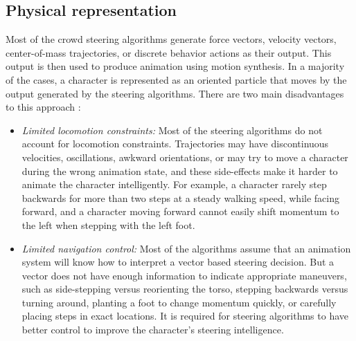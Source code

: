 \documentclass[tog]{acmsiggraph}
\begin{document}
\subsection{Physical representation}
Most of the crowd steering algorithms generate force vectors, velocity vectors, center-of-mass trajectories, or discrete behavior actions as their output. This output is then used to produce animation using motion synthesis. In a majority of the cases, a character is represented as an oriented particle that moves by the output generated by the steering algorithms. There are two main disadvantages to this approach \cite{singh2010interface}:
\begin{itemize}
\item \textit{Limited locomotion constraints:} Most of the steering algorithms do not account for locomotion constraints. Trajectories may have discontinuous velocities, oscillations, awkward orientations, or may try to move a character during the wrong animation state, and these side-effects make it harder to animate the character intelligently. For example, a character rarely step backwards for more than two steps at a steady walking speed, while facing forward, and a character moving forward cannot easily shift momentum to the left when stepping with the left foot.
\item \textit{Limited navigation control:} Most of the algorithms assume that an animation system will know how to interpret a vector based steering decision. But a vector does not have enough information to indicate appropriate maneuvers, such as side-stepping versus reorienting the torso, stepping backwards versus turning around, planting a foot to change momentum quickly, or carefully placing steps in exact locations. It is required for steering algorithms to have better control to improve the character’s steering intelligence.
\end{itemize}
\end{document}
